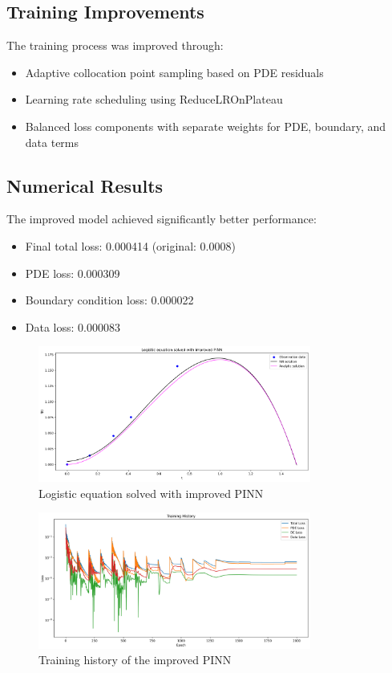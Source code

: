 \documentclass[11pt,a4paper]{article}
\begin{document}
\subsection{Training Improvements}
The training process was improved through:
\begin{itemize}
    \item Adaptive collocation point sampling based on PDE residuals
    \item Learning rate scheduling using ReduceLROnPlateau
    \item Balanced loss components with separate weights for PDE, boundary, and data terms
\end{itemize}

\subsection{Numerical Results}
The improved model achieved significantly better performance:
\begin{itemize}
    \item Final total loss: 0.000414 (original: 0.0008)
    \item PDE loss: 0.000309
    \item Boundary condition loss: 0.000022
    \item Data loss: 0.000083
\end{itemize}

\begin{figure}[h]
    \centering
    \includegraphics[width=0.8\textwidth]{figures/pinn_improved.png}
    \caption{Logistic equation solved with improved PINN}
    \label{fig:improved}
\end{figure}

\begin{figure}[h]
    \centering
    \includegraphics[width=0.8\textwidth]{figures/pinn_improved_history.png}
    \caption{Training history of the improved PINN}
    \label{fig:improved_history}
\end{figure}
\end{document}
